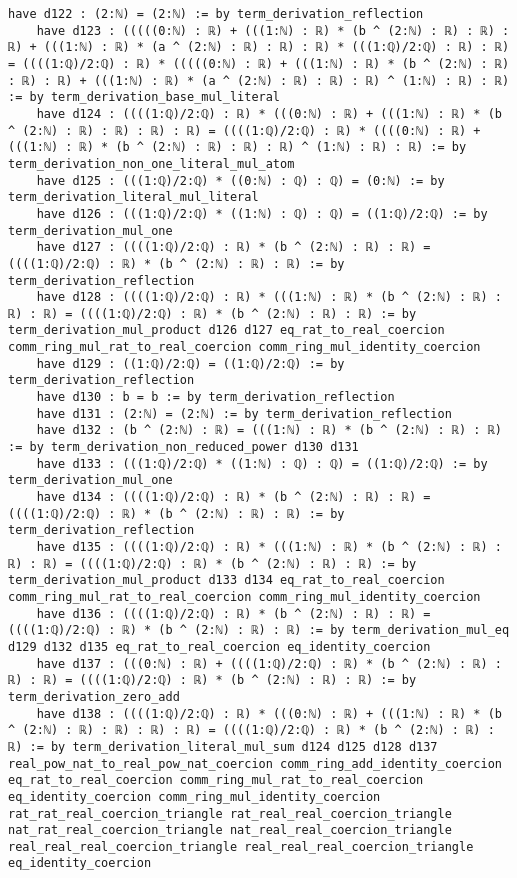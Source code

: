 \documentclass{article}
\begin{document}
\begin{tcolorbox}[colback=white!10, width=\linewidth]
\begin{lstlisting}[language=Lean4]
    have d122 : (2:ℕ) = (2:ℕ) := by term_derivation_reflection
    have d123 : (((((0:ℕ) : ℝ) + (((1:ℕ) : ℝ) * (b ^ (2:ℕ) : ℝ) : ℝ) : ℝ) + (((1:ℕ) : ℝ) * (a ^ (2:ℕ) : ℝ) : ℝ) : ℝ) * (((1:ℚ)/2:ℚ) : ℝ) : ℝ) = ((((1:ℚ)/2:ℚ) : ℝ) * (((((0:ℕ) : ℝ) + (((1:ℕ) : ℝ) * (b ^ (2:ℕ) : ℝ) : ℝ) : ℝ) + (((1:ℕ) : ℝ) * (a ^ (2:ℕ) : ℝ) : ℝ) : ℝ) ^ (1:ℕ) : ℝ) : ℝ) := by term_derivation_base_mul_literal
    have d124 : ((((1:ℚ)/2:ℚ) : ℝ) * (((0:ℕ) : ℝ) + (((1:ℕ) : ℝ) * (b ^ (2:ℕ) : ℝ) : ℝ) : ℝ) : ℝ) = ((((1:ℚ)/2:ℚ) : ℝ) * ((((0:ℕ) : ℝ) + (((1:ℕ) : ℝ) * (b ^ (2:ℕ) : ℝ) : ℝ) : ℝ) ^ (1:ℕ) : ℝ) : ℝ) := by term_derivation_non_one_literal_mul_atom
    have d125 : (((1:ℚ)/2:ℚ) * ((0:ℕ) : ℚ) : ℚ) = (0:ℕ) := by term_derivation_literal_mul_literal
    have d126 : (((1:ℚ)/2:ℚ) * ((1:ℕ) : ℚ) : ℚ) = ((1:ℚ)/2:ℚ) := by term_derivation_mul_one
    have d127 : ((((1:ℚ)/2:ℚ) : ℝ) * (b ^ (2:ℕ) : ℝ) : ℝ) = ((((1:ℚ)/2:ℚ) : ℝ) * (b ^ (2:ℕ) : ℝ) : ℝ) := by term_derivation_reflection
    have d128 : ((((1:ℚ)/2:ℚ) : ℝ) * (((1:ℕ) : ℝ) * (b ^ (2:ℕ) : ℝ) : ℝ) : ℝ) = ((((1:ℚ)/2:ℚ) : ℝ) * (b ^ (2:ℕ) : ℝ) : ℝ) := by term_derivation_mul_product d126 d127 eq_rat_to_real_coercion comm_ring_mul_rat_to_real_coercion comm_ring_mul_identity_coercion
    have d129 : ((1:ℚ)/2:ℚ) = ((1:ℚ)/2:ℚ) := by term_derivation_reflection
    have d130 : b = b := by term_derivation_reflection
    have d131 : (2:ℕ) = (2:ℕ) := by term_derivation_reflection
    have d132 : (b ^ (2:ℕ) : ℝ) = (((1:ℕ) : ℝ) * (b ^ (2:ℕ) : ℝ) : ℝ) := by term_derivation_non_reduced_power d130 d131
    have d133 : (((1:ℚ)/2:ℚ) * ((1:ℕ) : ℚ) : ℚ) = ((1:ℚ)/2:ℚ) := by term_derivation_mul_one
    have d134 : ((((1:ℚ)/2:ℚ) : ℝ) * (b ^ (2:ℕ) : ℝ) : ℝ) = ((((1:ℚ)/2:ℚ) : ℝ) * (b ^ (2:ℕ) : ℝ) : ℝ) := by term_derivation_reflection
    have d135 : ((((1:ℚ)/2:ℚ) : ℝ) * (((1:ℕ) : ℝ) * (b ^ (2:ℕ) : ℝ) : ℝ) : ℝ) = ((((1:ℚ)/2:ℚ) : ℝ) * (b ^ (2:ℕ) : ℝ) : ℝ) := by term_derivation_mul_product d133 d134 eq_rat_to_real_coercion comm_ring_mul_rat_to_real_coercion comm_ring_mul_identity_coercion
    have d136 : ((((1:ℚ)/2:ℚ) : ℝ) * (b ^ (2:ℕ) : ℝ) : ℝ) = ((((1:ℚ)/2:ℚ) : ℝ) * (b ^ (2:ℕ) : ℝ) : ℝ) := by term_derivation_mul_eq d129 d132 d135 eq_rat_to_real_coercion eq_identity_coercion
    have d137 : (((0:ℕ) : ℝ) + ((((1:ℚ)/2:ℚ) : ℝ) * (b ^ (2:ℕ) : ℝ) : ℝ) : ℝ) = ((((1:ℚ)/2:ℚ) : ℝ) * (b ^ (2:ℕ) : ℝ) : ℝ) := by term_derivation_zero_add
    have d138 : ((((1:ℚ)/2:ℚ) : ℝ) * (((0:ℕ) : ℝ) + (((1:ℕ) : ℝ) * (b ^ (2:ℕ) : ℝ) : ℝ) : ℝ) : ℝ) = ((((1:ℚ)/2:ℚ) : ℝ) * (b ^ (2:ℕ) : ℝ) : ℝ) := by term_derivation_literal_mul_sum d124 d125 d128 d137 real_pow_nat_to_real_pow_nat_coercion comm_ring_add_identity_coercion eq_rat_to_real_coercion comm_ring_mul_rat_to_real_coercion eq_identity_coercion comm_ring_mul_identity_coercion rat_rat_real_coercion_triangle rat_real_real_coercion_triangle nat_rat_real_coercion_triangle nat_real_real_coercion_triangle real_real_real_coercion_triangle real_real_real_coercion_triangle eq_identity_coercion

\end{lstlisting}
\end{tcolorbox}
\end{document}
